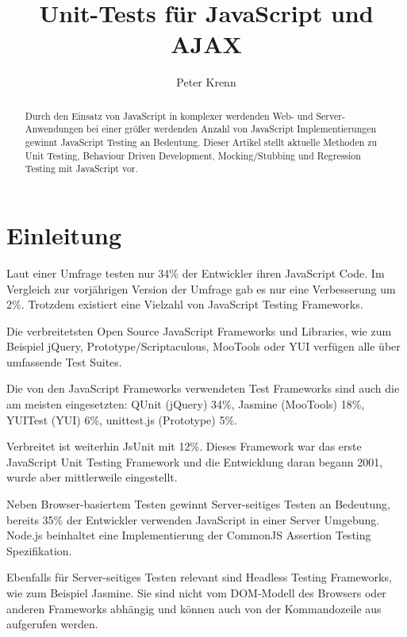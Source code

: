 \documentclass[11pt, a4paper]{article}
\title{Unit-Tests für JavaScript und AJAX}
\author{Peter Krenn}
\begin{document}
\maketitle

\begin{abstract}
Durch den Einsatz von JavaScript in komplexer werdenden Web- und
Server-Anwendungen bei einer größer werdenden Anzahl von JavaScript
Implementierungen gewinnt JavaScript Testing an Bedeutung. Dieser Artikel stellt
aktuelle Methoden zu Unit Testing, Behaviour Driven Development,
Mocking/Stubbing und Regression Testing mit JavaScript vor.
\end{abstract}

\tableofcontents

\section{Einleitung}

Laut einer Umfrage\cite{young_dailyjs_2010} testen nur 34\% der Entwickler ihren
JavaScript Code. Im Vergleich zur vorjährigen Version der
Umfrage\cite{young_dailyjs_2009} gab es nur eine Verbesserung um 2\%. Trotzdem
existiert eine Vielzahl von JavaScript Testing Frameworks.

Die verbreitetsten Open Source JavaScript Frameworks und Libraries, wie zum
Beispiel jQuery\cite{resig_jquery_2011},
Prototype/Scriptaculous\cite{prototype_js_prototype_2011},
MooTools\cite{mootools_mootools_2011} oder YUI\cite{yahoo_inc._yui_2011-1}
verfügen alle über umfassende Test Suites.

Die von den JavaScript Frameworks verwendeten Test Frameworks sind auch die
am meisten eingesetzten: QUnit\cite{zaefferer_qunit_2011} (jQuery) 34\%,
Jasmine\cite{jasmine_jasmine_2011} (MooTools) 18\%,
YUITest\cite{yahoo_inc._yui_2011} (YUI) 6\%,
unittest.js\cite{fuchs_unittest.js_2011} (Prototype) 5\%.

Verbreitet ist weiterhin JsUnit\cite{jsunit_jsunit_2011} mit 12\%. Dieses
Framework war das erste JavaScript Unit Testing Framework und die Entwicklung
daran begann 2001, wurde aber mittlerweile eingestellt.

Neben Browser-basiertem Testen gewinnt Server-seitiges Testen an Bedeutung,
bereits 35\% der Entwickler verwenden JavaScript in einer Server Umgebung.
Node.js beinhaltet eine Implementierung der CommonJS Assertion Testing
Spezifikation\cite{node.js_node.js_2011}.

Ebenfalls für Server-seitiges Testen relevant sind Headless Testing Frameworks,
wie zum Beispiel Jasmine. Sie sind nicht vom DOM-Modell des Browsers oder
anderen Frameworks abhängig und können auch von der Kommandozeile aus aufgerufen
werden.
\end{document}
